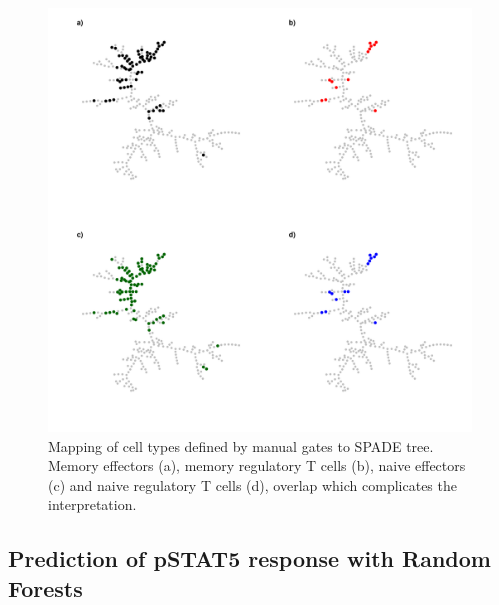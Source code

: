 \begin{figure}[h]
    \centering
    \includegraphics[scale=.5]{IL2/figures/spade-celltypes.pdf}
    {Mapping of cell types defined by manual gates to SPADE tree.}
    {
      Memory effectors (a), memory regulatory T cells (b), naive effectors (c) and naive regulatory T cells (d), overlap which complicates
      the interpretation.
    }
\end{figure}


\subsection{Prediction of pSTAT5 response with Random Forests}

